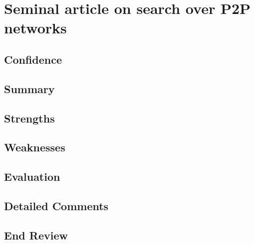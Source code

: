 \section{Seminal article on search over P2P networks}

\subsection{Confidence}

\subsection{Summary}

\subsection{Strengths}

\subsection{Weaknesses}

\subsection{Evaluation}

\subsection{Detailed Comments}

\subsection*{End Review}
